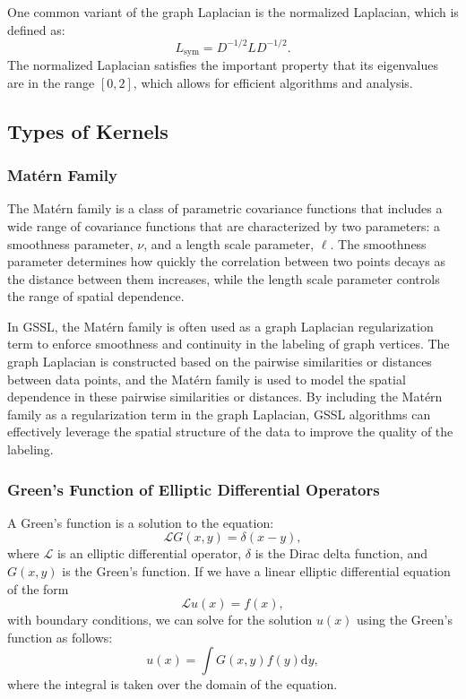 \documentclass[12pt]{amsart}
\begin{document}
One common variant of the graph Laplacian is the normalized Laplacian, which is defined as:
$$ L_{\text{sym}} = D^{-1/2} L D^{-1/2}. $$
The normalized Laplacian satisfies the important property that its eigenvalues are in the range $[0, 2]$, which allows for efficient algorithms and analysis. 

\subsection{Types of Kernels}
\subsubsection{Mat\'{e}rn Family}
The Mat\'{e}rn family is a class of parametric covariance functions that includes a wide range of covariance functions that are characterized by two parameters: a smoothness parameter, $\nu$, and a length scale parameter, $\ell$. The smoothness parameter determines how quickly the correlation between two points decays as the distance between them increases, while the length scale parameter controls the range of spatial dependence. 

In GSSL, the Mat\'{e}rn family is often used as a graph Laplacian regularization term to enforce smoothness and continuity in the labeling of graph vertices. The graph Laplacian is constructed based on the pairwise similarities or distances between data points, and the Mat\'{e}rn family is used to model the spatial dependence in these pairwise similarities or distances. By including the Mat\'{e}rn family as a regularization term in the graph Laplacian, GSSL algorithms can effectively leverage the spatial structure of the data to improve the quality of the labeling.
\subsubsection{Green's Function of Elliptic Differential Operators}
A Green's function is a solution to the equation:
$$\mathcal{L} G(x,y) = \delta(x-y),$$
where $\mathcal{L}$ is an elliptic differential operator, $\delta$ is the Dirac delta function, and $G(x,y)$ is the Green's function. If we have a linear elliptic differential equation of the form
$$\mathcal{L} u(x) = f(x),$$
with boundary conditions, we can solve for the solution $u(x)$ using the Green's function as follows:
$$u(x) = \int G(x,y) f(y) \mathrm{d}y,$$
where the integral is taken over the domain of the equation.
\end{document}
